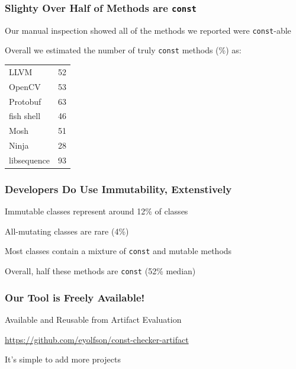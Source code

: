 \documentclass[aspectratio=169]{beamer}
\begin{document}
  \begin{frame}
    \frametitle{Slighty Over Half of Methods are \texttt{const}}

    Our manual inspection showed all of the methods we reported were
    \texttt{const}-able

    \vspace{2em}

    Overall we estimated the number of truly \texttt{const} methods (\%) as:

    \vspace{1em}
    
    \begin{center}\begin{tabular}{l r}
      LLVM         & 52\\
      OpenCV       & 53\\
      Protobuf     & 63 \\
      fish shell   & 46 \\
      Mosh         & 51 \\
      Ninja        & 28 \\
      libsequence  & 93 \\
    \end{tabular}\end{center}
  \end{frame}

  \begin{frame}
    \frametitle{Developers Do Use Immutability, Extenstively}

    Immutable classes represent around 12\% of classes

    \hspace{1em} All-mutating classes are rare (4\%)

    \vspace{2em}

    Most classes contain a mixture of \texttt{const} and mutable methods

    \hspace{1em} Overall, half these methods are \texttt{const} (52\% median)
  \end{frame}

  \begin{frame}
    \frametitle{Our Tool is Freely Available!}

    Available and Reusable from Artifact Evaluation

    \vspace{2em}

    \url{https://github.com/eyolfson/const-checker-artifact}

    \vspace{2em}

    It's simple to add more projects
  \end{frame}
\end{document}
